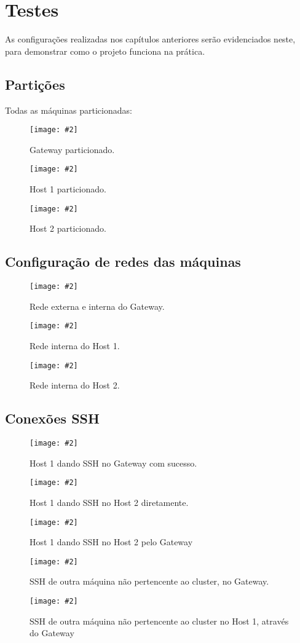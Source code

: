 \documentclass[
	12pt,				%
	openany,			%
	a4paper,			%
	chapter=TITLE,		%
	section=TITLE,		%
	english,
	brazil				%
]{abntex2}
\newcommand{\includeImage}[3] {

\begin{figure}[H]
 	 \centering
  		\texttt{[image: \#2]}
  	\caption{#3}
\end{figure}

}
\begin{document}
\section{Testes}

As configurações realizadas nos capítulos anteriores serão evidenciados neste, para demonstrar como o projeto funciona na prática.

\subsection{Partições}

Todas as máquinas particionadas:

\includeImage{0.65}{imgs/testes/1-gateway_particoes.png}{Gateway particionado.}

\includeImage{0.6}{imgs/testes/1-host1_particoes.png}{Host 1 particionado.}

\includeImage{0.6}{imgs/testes/1-host2_particoes.png}{Host 2 particionado.}

\subsection{Configuração de redes das máquinas}

\includeImage{0.6}{imgs/testes/2-gateway_rede_interna_e_externa.png}{Rede externa e interna do Gateway.}

\includeImage{0.6}{imgs/testes/2-host1_rede_interna.png}{Rede interna do Host 1.}

\includeImage{0.6}{imgs/testes/2-host2_rede_interna.png}{Rede interna do Host 2.}

\subsection{Conexões SSH}

\includeImage{0.6}{imgs/testes/3-host1_consegue_dar_ssh_no_gateway.png}{Host 1 dando SSH no Gateway com sucesso.}

\includeImage{0.6}{imgs/testes/3-host1_dando_ssh_no_host2_com_sucesso.png}{Host 1 dando SSH no Host 2 diretamente.}

\includeImage{0.6}{imgs/testes/3-host1_dando_ssh_no_gateway_e_depois_no_host2.png}{Host 1 dando SSH no Host 2 pelo Gateway}

\includeImage{0.6}{imgs/testes/3-dando_ssh_de_outra_maquina_no_gateway.png}{SSH de outra máquina não pertencente ao cluster, no Gateway.}

\includeImage{0.6}{imgs/testes/3-dando_ssh_de_outra_maquina_no_host1_pelo_gateway.png}{SSH de outra máquina não pertencente ao cluster no Host 1, através do Gateway}
\end{document}
